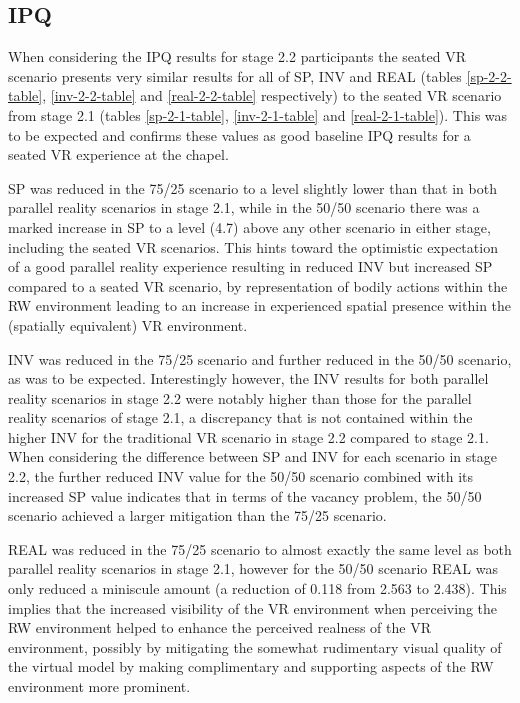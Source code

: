 
\subsection{IPQ}

When considering the IPQ results for stage 2.2 participants the seated VR scenario presents very similar results for all of SP, INV and REAL (tables \ref{sp-2-2-table}, \ref{inv-2-2-table} and \ref{real-2-2-table} respectively) to the seated VR scenario from stage 2.1 (tables \ref{sp-2-1-table}, \ref{inv-2-1-table} and \ref{real-2-1-table}). This was to be expected and confirms these values as good baseline IPQ results for a seated VR experience at the chapel.

SP was reduced in the 75/25 scenario to a level slightly lower than that in both parallel reality scenarios in stage 2.1, while in the 50/50 scenario there was a marked increase in SP to a level (4.7) above any other scenario in either stage, including the seated VR scenarios. This hints toward the optimistic expectation of a good parallel reality experience resulting in reduced INV but increased SP compared to a seated VR scenario, by representation of bodily actions within the RW environment leading to an increase in experienced spatial presence within the (spatially equivalent) VR environment.

INV was reduced in the 75/25 scenario and further reduced in the 50/50 scenario, as was to be expected. Interestingly however, the INV results for both parallel reality scenarios in stage 2.2 were notably higher than those for the parallel reality scenarios of stage 2.1, a discrepancy that is not contained within the higher INV for the traditional VR scenario in stage 2.2 compared to stage 2.1. When considering the difference between SP and INV for each scenario in stage 2.2, the further reduced INV value for the 50/50 scenario combined with its increased SP value indicates that in terms of the vacancy problem, the 50/50 scenario achieved a larger mitigation than the 75/25 scenario.

REAL was reduced in the 75/25 scenario to almost exactly the same level as both parallel reality scenarios in stage 2.1, however for the 50/50 scenario REAL was only reduced a miniscule amount (a reduction of 0.118 from 2.563 to 2.438). This implies that the increased visibility of the VR environment when perceiving the RW environment helped to enhance the perceived realness of the VR environment, possibly by mitigating the somewhat rudimentary visual quality of the virtual model by making complimentary and supporting aspects of the RW environment more prominent.

